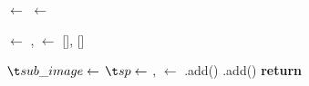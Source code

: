 \MakeRobust{\Call}

\begin{algorithmic}[1]
\label{alg:line:bodyregion} \State \body $\gets$ 
\label{alg:line:strokewidth} \State \strokewidth $\gets$  
\item[]
\label{alg:line:segmentationpoints} \State \segmentationpoints $\gets$  
\State \segmentfurther, \characters $\gets$ [\image], []
\item[]
\label{alg:line:whileCondition} 
	\label{alg:line:selectSubImage}\State $\subimage \gets$  
	\label{alg:line:selectSegmentationPoint}\State $\segmentationpoint \gets$  
	\label{alg:line:split}\State \leftsubimage, \rightsubimage $\gets$ 
   \label{alg:line:assigntolist}
      \State \characters.add(\leftsubimage)
   \Else
		\State \segmentfurther.add(\leftsubimage)
   \EndIf {}
\EndWhile
\label{alg:line:merge}\State \textbf{return} 
\EndFunction
\end{algorithmic}